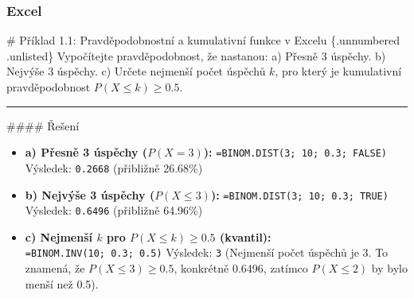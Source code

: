 \documentclass[
  czech,
  11pt,
  letterpaper,
  DIV=11,
  numbers=noendperiod]{scrreprt}
\begin{document}
\subsubsection*{Excel}\label{excel}

\begin{tcolorbox}[enhanced jigsaw, arc=.35mm, bottomrule=.15mm, bottomtitle=1mm, breakable, colback=white, colbacktitle=quarto-callout-note-color!10!white, colframe=quarto-callout-note-color-frame, coltitle=black, left=2mm, leftrule=.75mm, opacityback=0, opacitybacktitle=0.6, rightrule=.15mm, title=\textcolor{quarto-callout-note-color}{\faInfo}\hspace{0.5em}{Poznámka}, titlerule=0mm, toprule=.15mm, toptitle=1mm]

\# Příklad 1.1: Pravděpodobnostní a kumulativní funkce v Excelu
\{.unnumbered .unlisted\} Vypočítejte pravděpodobnost, že nastanou: a)
Přesně 3 úspěchy. b) Nejvýše 3 úspěchy. c) Určete nejmenší počet úspěchů
\(k\), pro který je kumulativní pravděpodobnost \(P(X \le k) \ge 0.5\).

\begin{center}\rule{0.5\linewidth}{0.5pt}\end{center}

\#\#\#\# Řešení

\begin{itemize}
\item
  \textbf{a) Přesně 3 úspěchy (\(P(X=3)\)):}
  \texttt{=BINOM.DIST(3;\ 10;\ 0.3;\ FALSE)} Výsledek: \texttt{0.2668}
  (přibližně 26.68\%)
\item
  \textbf{b) Nejvýše 3 úspěchy (\(P(X \le 3)\)):}
  \texttt{=BINOM.DIST(3;\ 10;\ 0.3;\ TRUE)} Výsledek: \texttt{0.6496}
  (přibližně 64.96\%)
\item
  \textbf{c) Nejmenší \(k\) pro \(P(X \le k) \ge 0.5\) (kvantil):}
  \texttt{=BINOM.INV(10;\ 0.3;\ 0.5)} Výsledek: \texttt{3} (Nejmenší
  počet úspěchů je 3. To znamená, že \(P(X \le 3) \ge 0.5\), konkrétně
  0.6496, zatímco \(P(X \le 2)\) by bylo menší než 0.5).
\end{itemize}

\end{tcolorbox}
\end{document}
